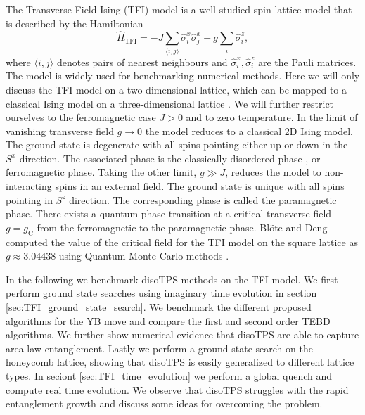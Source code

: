 The Transverse Field Ising (TFI) model is a well-studied spin lattice model that is described by the Hamiltonian
\begin{equation}
	\label{eq:TFI_Hamiltonian}
	\hat{H}_\text{TFI} = -J\sum_{\langle i,j\rangle} \hat{\sigma}^x_i \hat{\sigma}^x_j - g\sum_{i} \hat{\sigma}^z_i,
\end{equation}
where $\langle i,j\rangle$ denotes pairs of nearest neighbours and $\hat{\sigma}^x_i, \hat{\sigma}^z_i$ are the Pauli matrices. The model is widely used for benchmarking numerical methods. Here we will only discuss the TFI model on a two-dimensional lattice, which can be mapped to a classical Ising model on a three-dimensional lattice \cite{cite:from_d_dimensional_quantum_to_dp1_dimensional_classical}. We will further restrict ourselves to the ferromagnetic case $J > 0$ and to zero temperature. In the limit of vanishing transverse field $g \rightarrow 0$ the model reduces to a classical 2D Ising model. The ground state is degenerate with all spins pointing either up or down in the $S^x$ direction. The associated phase is the classically disordered phase \cite{cite:critical_behavior_of_the_two_dim_ising_model_in_transverse_field, cite:quantum_ising_phases_and_transitions_in_transverse_ising_models}, or ferromagnetic phase. Taking the other limit, $g \gg J$, reduces the model to non-interacting spins in an external field. The ground state is unique with all spins pointing in $S^z$ direction. The corresponding phase is called the paramagnetic phase. There exists a quantum phase transition at a critical transverse field $g = g_\text{C}$ from the ferromagnetic to the paramagnetic phase. Blöte and Deng computed the value of the critical field for the TFI model on the square lattice as $g \approx 3.04438$ using Quantum Monte Carlo methods \cite{cite:cluster_monte_carlo_simulation_of_TFI}. \par
In the following we benchmark disoTPS methods on the TFI model. We first perform ground state searches using imaginary time evolution in section \ref{sec:TFI_ground_state_search}. We benchmark the different proposed algorithms for the YB move and compare the first and second order TEBD algorithms. We further show numerical evidence that disoTPS are able to capture area law entanglement. Lastly we perform a ground state search on the honeycomb lattice, showing that disoTPS is easily generalized to different lattice types. In seciont \ref{sec:TFI_time_evolution} we perform a global quench and compute real time evolution. We observe that disoTPS struggles with the rapid entanglement growth and discuss some ideas for overcoming the problem. \par

